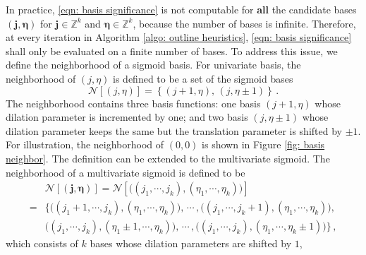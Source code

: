 In practice, \eqref{eqn: basis significance} is not computable
for \textbf{all} the candidate bases $(\boldsymbol{j}, \boldsymbol{\eta})$
for $\boldsymbol{j}\in \mathbb{Z}^k$ and
$\boldsymbol{\eta}\in \mathbb{Z}^k$, because the number of bases is infinite. 
Therefore, at every iteration in Algorithm \ref{algo: outline heuristics},
\eqref{eqn: basis significance} shall only be evaluated on a finite number of bases. 
To address this issue, we define the neighborhood of a sigmoid basis. 
For univariate basis, the neighborhood of $(j,\eta)$ is defined to be a set of the sigmoid bases
\begin{equation}
    \mathcal{N}\left[ \left(j,\eta\right) \right]
    = \left\{ 
        \left( j+1, \eta\right),\,
        \left( j, \eta\pm 1 \right)
    \right\}\,.
    \label{eqn: neighborhood 1D}
\end{equation}
The neighborhood contains three basis functions: one basis 
$\left( j+1, \eta \right)$ 
whose dilation parameter is incremented by one; and
two basis $\left( j, \eta\pm 1 \right)$
whose dilation parameter keeps the same but the translation parameter is shifted by $\pm 1$.
For illustration, the neighborhood of $\left(0,0\right)$
is shown in Figure \ref{fig: basis neighbor}.
The definition can be extended to the multivariate sigmoid. 
The neighborhood of a multivariate sigmoid is defined to be
\begin{equation}\begin{split}
    &\mathcal{N}
    \left[
         \left(
               \boldsymbol{j}, \boldsymbol{\eta}
         \right)
    \right] = 
    \mathcal{N}\left[ \big((j_1, \cdots, j_k) , \left(
    \eta_1, \cdots, \eta_k \right) \big) \right]\\
    = & \bigg\{
            \big( \left( j_1+1,\cdots, j_k\right),
                   \left( \eta_1, \cdots, \eta_k \right)
            \big) ,\, \cdots \, ,
            \big( \left( j_1,\cdots, j_k+1\right),
                   \left( \eta_1, \cdots, \eta_k \right)
            \big),\,   \\
          & 
            \big( \left( j_1,\cdots, j_k\right),
                   \left( \eta_1\pm 1, \cdots, \eta_k \right)
            \big) ,\, \cdots \, ,
            \big( \left( j_1,\cdots, j_k\right),
                   \left( \eta_1, \cdots, \eta_k\pm 1 \right)
            \big) \bigg\}\,,
    \label{eqn: neighborhood kD}
\end{split}\end{equation}
which consists of $k$ bases whose dilation parameters are shifted by $1$, 
